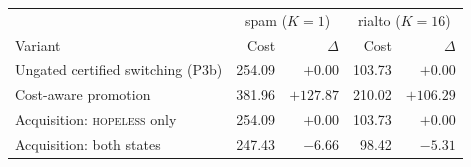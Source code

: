 \begin{tabular}{lrrrr}
\toprule
& \multicolumn{2}{c}{spam ($K=1$)} & \multicolumn{2}{c}{rialto ($K=16$)} \\
Variant & Cost & $\Delta$ & Cost & $\Delta$ \\
\midrule
Ungated certified switching (P3b) & 254.09 & $+0.00$ & 103.73 & $+0.00$ \\
Cost-aware promotion & 381.96 & $+127.87$ & 210.02 & $+106.29$ \\
Acquisition: \textsc{hopeless} only & 254.09 & $+0.00$ & 103.73 & $+0.00$ \\
Acquisition: both states & 247.43 & $-6.66$ & 98.42 & $-5.31$ \\
\bottomrule
\end{tabular}
